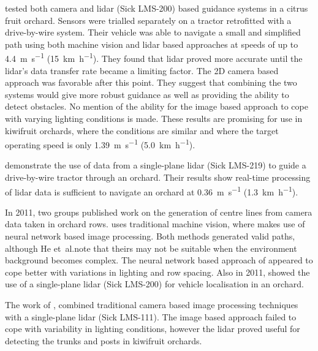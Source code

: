 \documentclass[preprint,authoryear,12pt]{elsarticle}
\begin{document}

        \cite{Subramanian2006} tested both camera and lidar (Sick LMS-200) based guidance systems in a citrus fruit orchard.
        Sensors were trialled separately on a tractor retrofitted with a drive-by-wire system.
        Their vehicle was able to navigate a small and simplified path using both machine vision and lidar based approaches at speeds of up to \SI{4.4}{\meter\per\second} (\SI{15}{\kilo\meter\per\hour}).
        They found that lidar proved more accurate until the lidar's data transfer rate became a limiting factor.
        The 2D camera based approach was favorable after this point.
        They suggest that combining the two systems would give more robust guidance as well as providing the ability to detect obstacles.
        No mention of the ability for the image based approach to cope with varying lighting conditions is made.
        These results are promising for use in kiwifruit orchards, where the conditions are similar and where the target operating speed is only \SI{1.39}{\meter\per\second} (\SI{5.0}{\kilo\meter\per\hour}).

        \cite{Barawid2007} demonstrate the use of data from a single-plane lidar (Sick LMS-219) to guide a drive-by-wire tractor through an orchard.
        Their results show real-time processing of lidar data is sufficient to navigate an orchard at \SI{0.36}{\meter\per\second} (\SI{1.3}{\kilo\meter\per\hour}).

        In 2011, two groups published work on the generation of centre lines from camera data taken in orchard rows.
        \cite{He2011} uses traditional machine vision, where \cite{Torres2011} makes use of neural network based image processing.
        Both methods generated valid paths, although He et~al.\@ note that theirs may not be suitable when the environment background becomes complex.
        The neural network based approach of \cite{Torres2011} appeared to cope better with variations in lighting and row spacing.
        Also in 2011, \cite{Hansen2011} showed the use of a single-plane lidar (Sick LMS-200) for vehicle localisation in an orchard.

        The work of \cite{Scarfe2012}, combined traditional camera based image processing techniques with a single-plane lidar (Sick LMS-111).
        The image based approach failed to cope with variability in lighting conditions, however the lidar proved useful for detecting the trunks and posts in kiwifruit orchards.
\end{document}
